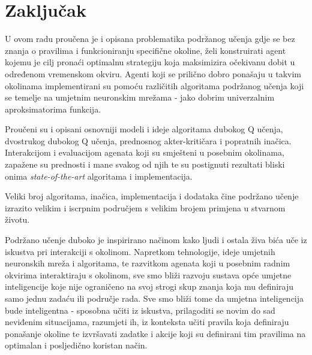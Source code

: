 \chapter{Zaključak}

U ovom radu proučena je i opisana problematika podržanog učenja gdje se bez znanja o pravilima i funkcioniranju specifične okoline, želi konstruirati agent kojemu je cilj pronaći optimalnu strategiju koja maksimizira očekivanu dobit u određenom vremenskom okviru. Agenti koji se prilično dobro ponašaju u takvim okolinama implementirani su pomoću različitih algoritama podržanog učenja koji se temelje na umjetnim neuronskim mrežama - jako dobrim univerzalnim aproksimatorima funkcija.

Proučeni su i opisani osnovniji modeli i ideje algoritama dubokog Q učenja, dvostrukog dubokog Q učenja, prednosnog akter-kritičara i popratnih inačica. Interakcijom i evaluacijom agenata koji su smješteni u posebnim okolinama, zapažene su prednosti i mane svakog od njih te su postignuti rezultati bliski onima \textit{state-of-the-art} algoritama i implementacija. 

Veliki broj algoritama, inačica, implementacija i dodataka čine podržano učenje izrazito velikim i iscrpnim područjem s velikim brojem primjena u stvarnom životu.

Podržano učenje duboko je inspirirano načinom kako ljudi i ostala živa bića uče iz iskustva pri interakciji s okolinom. Napretkom tehnologije, ideje umjetnih neuronskih mreža i algoritama, te razvitkom agenata koji u posebnim radnim okvirima interaktiraju s okolinom, sve smo bliži razvoju sustava opće umjetne inteligencije koje nije ograničeno na svoj strogi skup znanja koja mu definiraju samo jednu zadaću ili područje rada. Sve smo bliži tome da umjetna inteligencija bude inteligentna - sposobna učiti iz iskustva, prilagoditi se novim do sad neviđenim situacijama, razumjeti ih, iz konteksta učiti pravila koja definiraju ponašanje okoline te izvršavati zadatke i akcije koji su definirani tim pravilima na optimalan i posljedično koristan način.